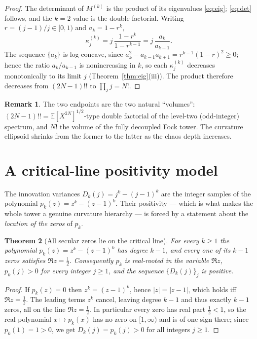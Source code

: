 \documentclass[11pt,reqno]{amsart}
\theoremstyle{plain}
\newtheorem{theorem}{Theorem}[section]
\theoremstyle{definition}
\newtheorem{remark}[theorem]{Remark}
\newcommand{\E}{\mathbb{E}}
\begin{document}
\begin{proof}
The determinant of $M^{(k)}$ is the product of its eigenvalues \eqref{eq:eig};
\eqref{eq:det} follows, and the $k=2$ value is the double factorial. Writing
$r=(j-1)/j\in[0,1)$ and $a_k=1-r^{k}$,
\[
  \kappa_j^{(k)}=j\,\frac{1-r^{k}}{1-r^{k-1}}=j\,\frac{a_k}{a_{k-1}} .
\]
The sequence $\{a_k\}$ is log-concave, since
$a_k^{2}-a_{k-1}a_{k+1}=r^{k-1}(1-r)^{2}\ge0$; hence the ratio $a_k/a_{k-1}$ is
nonincreasing in $k$, so each $\kappa_j^{(k)}$ decreases monotonically to its
limit $j$ (Theorem~\ref{thm:eig}(iii)). The product therefore decreases from
$(2N-1)!!$ to $\prod_j j=N!$.
\end{proof}

\begin{remark}
The two endpoints are the two natural ``volumes'': $(2N-1)!!=\E[X^{2N}]^{1/2}$-type
double factorial of the level-two (odd-integer) spectrum, and $N!$ the volume of
the fully decoupled Fock tower. The curvature ellipsoid shrinks from the former
to the latter as the chaos depth increases.
\end{remark}

\section{A critical-line positivity model}\label{sec:critline}

The innovation variances $D_k(j)=j^{k}-(j-1)^{k}$ are the integer samples of the
polynomial $p_k(z)=z^{k}-(z-1)^{k}$. Their positivity --- which is what makes the
whole tower a genuine curvature hierarchy --- is forced by a statement about the
\emph{location of the zeros} of $p_k$.

\begin{theorem}[All secular zeros lie on the critical line]\label{thm:critline}
For every $k\ge1$ the polynomial $p_k(z)=z^{k}-(z-1)^{k}$ has degree $k-1$, and
every one of its $k-1$ zeros satisfies $\Re z=\tfrac12$. Consequently $p_k$ is
real-rooted in the variable $\Re z$, $p_k(j)>0$ for every integer $j\ge1$, and
the sequence $\{D_k(j)\}_j$ is positive.
\end{theorem}

\begin{proof}
If $p_k(z)=0$ then $z^{k}=(z-1)^{k}$, hence $|z|=|z-1|$, which holds iff
$\Re z=\tfrac12$. The leading terms $z^{k}$ cancel, leaving degree $k-1$ and thus
exactly $k-1$ zeros, all on the line $\Re z=\tfrac12$. In particular every zero
has real part $\tfrac12<1$, so the real polynomial $x\mapsto p_k(x)$ has no zero
on $[1,\infty)$ and is of one sign there; since $p_k(1)=1>0$, we get
$D_k(j)=p_k(j)>0$ for all integers $j\ge1$.
\end{proof}
\end{document}
